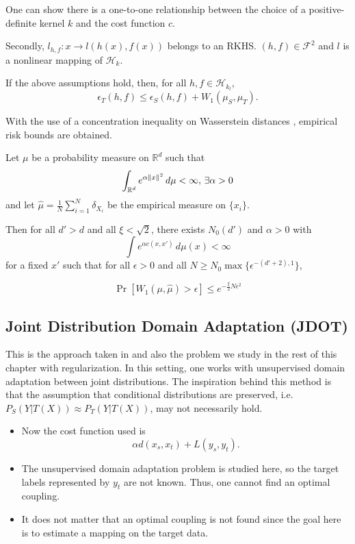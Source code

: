 One can show there is a one-to-one relationship between the choice of a positive-definite kernel $k$ and the cost function $c$.

Secondly, $l_{h,f}:x\to l(h(x),f(x))$ belongs to an RKHS. $(h,f)\in \mathcal{F}^2$ and $l$ is a nonlinear mapping of $\mathcal{H}_k$.

\medskip

\begin{lemma}
	If the above assumptions hold, then, for all $h,f\in \mathcal{H}_{k_l}$, 
	\[ \epsilon_T(h,f)\leq \epsilon_S(h,f) + W_1(\mu_S,\mu_T). \]
\end{lemma}

With the use of a concentration inequality on Wasserstein distances \cite{Bolley2007}, empirical risk bounds are obtained.

\begin{theorem}
	Let $\mu$ be a probability measure on $\mathbb{R}^d$ such that
	\[
	\int_{\mathbb{R}^d} e^{\alpha \lVert x\rVert^2}\,d\mu < \infty, \, \exists \alpha > 0
	\]
	and let $\hat{\mu}=\frac{1}{N}\sum_{i=1}^N \delta_{X_i}$ be the empirical measure on $\{x_i\}$.
	
	Then for all $d'>d$ and all $\xi < \sqrt{2}$, there exists $N_0(d')$ and $\alpha > 0$ with
	\[
	\int e^{\alpha c(x,x')}\,d\mu(x) < \infty
	\]
	for a fixed $x'$ such that for all $\epsilon > 0$ and all $N\geq N_0 \max \{\epsilon^{-(d'+2),1}\}$,
	
	\[
	\Pr[W_1(\mu,\hat{\mu})>\epsilon] \leq e^{-\frac{\xi}{2} N\epsilon^2}
	\]
\end{theorem}

\subsection*{Joint Distribution Domain Adaptation (JDOT)}
This is the approach taken in \cite{Courty2017} and also the problem we study in the rest of this chapter with regularization. In this setting, one works with unsupervised domain adaptation between joint distributions. The inspiration behind this method is that the assumption that  conditional distributions are preserved, i.e. $P_S(Y|T(X))\approx P_T(Y|T(X))$, may not necessarily hold.
\begin{itemize}
	\item Now the cost function used is \[\alpha d(x_s,x_t) + L(y_s,y_t).\]
	\item The unsupervised domain adaptation problem is studied here, so the target labels represented by $y_t$ are not known. Thus, one cannot find an optimal coupling.
	\item It does not matter that an optimal coupling is not found since the goal here is to estimate a mapping on the target data.
\end{itemize}


